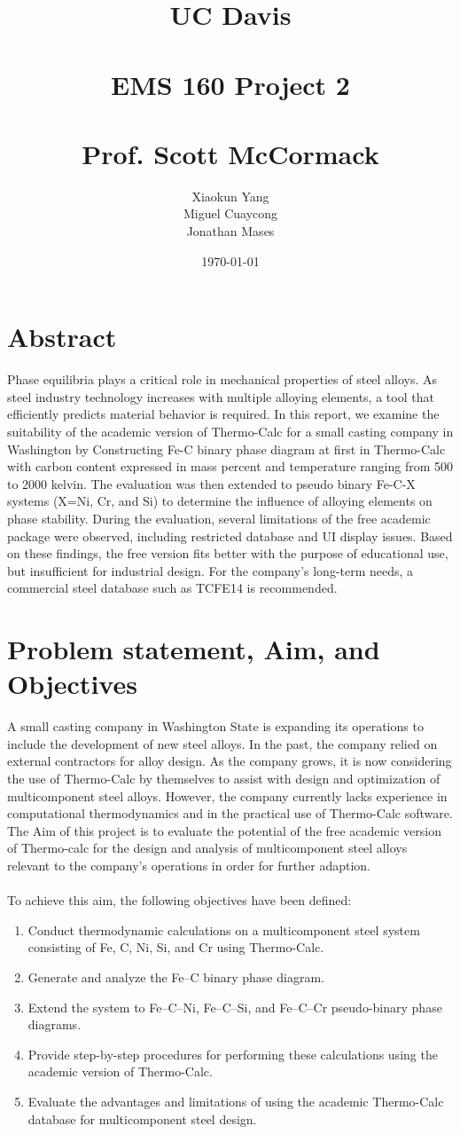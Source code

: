 \documentclass[11pt]{article}
\title{
UC Davis
\\~\\EMS 160 Project 2
\\~\\
Prof. Scott McCormack}
\author{Xiaokun Yang\\Miguel Cuaycong\\ Jonathan Mases}
\date{\today}
\begin{document}
\maketitle
\newpage
\tableofcontents
\newpage
\section{Abstract}
Phase equilibria plays a critical role in mechanical properties 
of steel alloys. As steel industry technology increases with 
multiple alloying elements, a tool that efficiently predicts 
material behavior is required. In this report, we examine the 
suitability of the academic version of Thermo-Calc for a small 
casting company in Washington by Constructing Fe-C binary phase 
diagram at first in Thermo-Calc with carbon content expressed 
in mass percent and temperature ranging from 500 to 2000 kelvin. 
The evaluation was then extended to pseudo binary Fe-C-X systems
 (X=Ni, Cr, and Si) to determine the influence of alloying 
 elements on phase stability. During the evaluation, several 
 limitations of the free academic package were observed, 
 including restricted database and UI display issues. 
 Based on these findings, the free version fits better with the 
 purpose of educational use, but insufficient for industrial 
 design. For the company’s long-term needs, a commercial steel 
 database such as TCFE14 is recommended. 
\section{Problem statement, Aim, and Objectives}
A small casting company in Washington State is expanding its operations to include the development of new steel alloys. In the past, the company relied on external contractors for alloy design. As the company grows, it is now considering the use of Thermo-Calc by themselves to assist with design and optimization of multicomponent steel alloys. However, the company currently lacks experience in computational thermodynamics and in the practical use of Thermo-Calc software.
The Aim of this project is to evaluate the potential of the free academic version of Thermo-calc for the design and analysis of multicomponent steel alloys relevant to the company’s operations in order for further adaption. 
\\~\\
To achieve this aim, the following objectives have been defined:
\begin{enumerate}
    \item Conduct thermodynamic calculations on a multicomponent steel system consisting of Fe, C, Ni, Si, and Cr using Thermo-Calc.
    \item Generate and analyze the Fe–C binary phase diagram.
    \item Extend the system to Fe–C–Ni, Fe–C–Si, and Fe–C–Cr pseudo-binary phase diagrams.
    \item Provide step-by-step procedures for performing these calculations using the academic version of Thermo-Calc.
    \item Evaluate the advantages and limitations of using the academic Thermo-Calc database for multicomponent steel design.

\end{enumerate}
\end{document}
